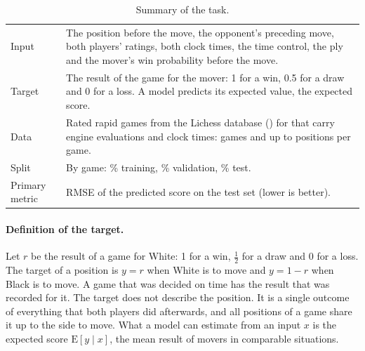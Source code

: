 \documentclass[11pt]{article}
\begin{document}
\begin{table}[htbp]\centering\small
\begin{tabularx}{\textwidth}{lL}
\toprule
Input & The position before the move, the opponent's preceding move, both
players' ratings, both clock times, the time control, the ply and the mover's
win probability before the move. \\
Target & The result of the game for the mover: 1 for a win, 0.5 for a draw
and 0 for a loss. A model predicts its expected value, the expected score. \\
Data & Rated rapid games from the Lichess database () for
 that carry engine evaluations and clock times:
 games and up to  positions per game. \\
Split & By game: \% training, \%
validation, \% test. \\
Primary metric & RMSE of the predicted score on the test set (lower is
better). \\
\bottomrule
\end{tabularx}
\caption{Summary of the task.}
\label{tab:brief}
\end{table}

\paragraph{Definition of the target.}
Let $r$ be the result of a game for White: 1 for a win, $\tfrac{1}{2}$ for a
draw and 0 for a loss. The target of a position is $y = r$ when White is to
move and $y = 1 - r$ when Black is to move. A game that was decided on time
has the result that was recorded for it. The target does not describe the
position. It is a single outcome of everything that both players did
afterwards, and all positions of a game share it up to the side to move. What
a model can estimate from an input $x$ is the expected score
$\mathrm{E}[y \mid x]$, the mean result of movers in comparable situations.
\end{document}
